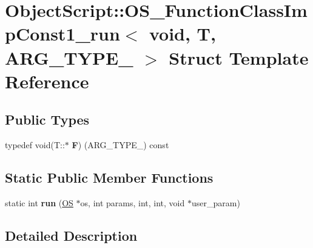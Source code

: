 \hypertarget{struct_object_script_1_1_o_s___function_class_imp_const1__run_3_01void_00_01_t_00_01_01_01_a_r_g___t_y_p_e__1_01_4}{}\section{Object\+Script\+:\+:O\+S\+\_\+\+Function\+Class\+Imp\+Const1\+\_\+run$<$ void, T, A\+R\+G\+\_\+\+T\+Y\+P\+E\+\_ $>$ Struct Template Reference}
\label{struct_object_script_1_1_o_s___function_class_imp_const1__run_3_01void_00_01_t_00_01_01_01_a_r_g___t_y_p_e__1_01_4}
\subsection*{Public Types}
\begin{DoxyCompactItemize}
\item 
typedef void(T\+::$\ast$ {\bfseries F}) (A\+R\+G\+\_\+\+T\+Y\+P\+E\+\_) const \hypertarget{struct_object_script_1_1_o_s___function_class_imp_const1__run_3_01void_00_01_t_00_01_01_01_a_r_g___t_y_p_e__1_01_4_a5a561f150227133b3dc39aed5aef00d6}{}\label{struct_object_script_1_1_o_s___function_class_imp_const1__run_3_01void_00_01_t_00_01_01_01_a_r_g___t_y_p_e__1_01_4_a5a561f150227133b3dc39aed5aef00d6}

\end{DoxyCompactItemize}
\subsection*{Static Public Member Functions}
\begin{DoxyCompactItemize}
\item 
static int {\bfseries run} (\hyperlink{class_object_script_1_1_o_s}{OS} $\ast$os, int params, int, int, void $\ast$user\+\_\+param)\hypertarget{struct_object_script_1_1_o_s___function_class_imp_const1__run_3_01void_00_01_t_00_01_01_01_a_r_g___t_y_p_e__1_01_4_adba2553b317b01c19dcbd31701007ad7}{}\label{struct_object_script_1_1_o_s___function_class_imp_const1__run_3_01void_00_01_t_00_01_01_01_a_r_g___t_y_p_e__1_01_4_adba2553b317b01c19dcbd31701007ad7}

\end{DoxyCompactItemize}


\subsection{Detailed Description}
